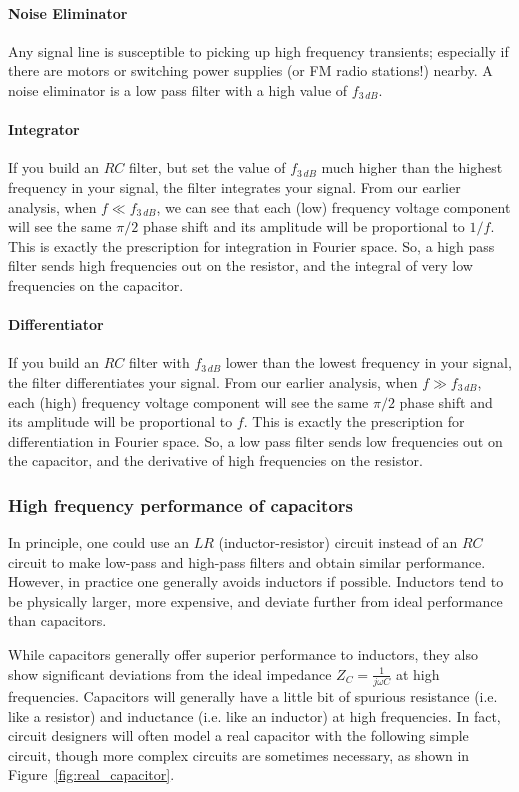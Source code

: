 \documentclass{article}
\begin{document}
\paragraph{Noise Eliminator}
Any signal line is susceptible to picking up high frequency transients; especially if there are motors or switching power supplies (or FM radio stations!) nearby. A noise eliminator is a low pass filter with a high value of $f_{3\,dB}$. 

\paragraph{Integrator}
If you build an $RC$ filter, but set the value of $f_{3\,dB}$ much higher than the highest frequency in your signal, the filter integrates your signal. From our earlier analysis, when $f \ll f_{3\,dB}$, we can see that each (low) frequency voltage component will see the same $\pi/2$ phase shift and its amplitude will be proportional to $1/f$. This is exactly the prescription for integration in Fourier space. So, a high pass filter sends high frequencies out on the resistor, and the integral of very low frequencies on the capacitor. 

\paragraph{Differentiator}
If you build an $RC$ filter with $f_{3\,dB}$ lower than the lowest frequency in your signal, the filter differentiates your signal. From our earlier analysis, when $f \gg f_{3\,dB}$, each (high) frequency voltage component will see the same $\pi/2$ phase shift and its amplitude will be proportional to $f$. This is exactly the prescription for differentiation in Fourier space. So, a low pass filter sends low frequencies out on the capacitor, and the derivative of high frequencies on the resistor.

\subsubsection{High frequency performance of capacitors}
In principle, one could use an $LR$ (inductor-resistor) circuit instead of an $RC$ circuit to make low-pass and high-pass filters and obtain similar performance. However, in practice one generally avoids inductors if possible. Inductors tend to be physically larger, more expensive, and deviate further from ideal performance than capacitors.

While capacitors generally offer superior performance to inductors, they also show significant deviations from the ideal impedance $Z_C = \frac{1}{j\omega C}$ at high frequencies. Capacitors will generally have a little bit of spurious resistance (i.e. like a resistor) and inductance (i.e. like an inductor) at high frequencies. In fact, circuit designers will often model a real capacitor with the following simple circuit, though more complex circuits are sometimes necessary, as shown in Figure~\ref{fig:real_capacitor}.
\end{document}
